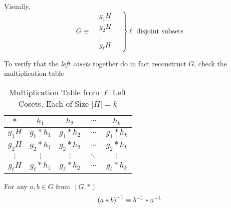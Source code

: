 \begin{remark}
    Visually,
    \begin{equation}
        G \equiv \left. \begin{matrix}
            &\boxed{{g_1} H} \\
            &\boxed{{g_2} H} \\
            &\vdots \\
            &\boxed{{g_\ell} H}
        \end{matrix} \quad \right\} \ell \text{ disjoint subsets}
    \end{equation}
    
    To verify that the \textit{left cosets} together do in fact reconstruct $G$, check the multiplication table
    \begin{table}[H]
    \centering
    \begin{tabular}{c | c c c c}
    \toprule
    $\ast$     & $h_1$             & $h_2$             & $\cdots$ & $h_k$ \\ 
    \midrule
    $g_1 H$    & $g_1 \ast h_1$    & $g_1 \ast h_2$    & $\cdots$ & $g_1 \ast h_k$ \\
    $g_2 H$    & $g_2 \ast h_1$    & $g_2 \ast h_2$    & $\cdots$ & $g_2 \ast h_k$ \\
    $\vdots$   & $\vdots$          & $\vdots$          & $\ddots$ & $\vdots$ \\
    $g_\ell H$ & $g_\ell \ast h_1$ & $g_\ell \ast h_2$ & $\cdots$ & $g_\ell \ast h_k$ \\ 
    \bottomrule
    \end{tabular}
    \caption{Multiplication Table from $\ell$ Left Cosets, Each of Size $\lvert H \rvert = k$}
    \end{table}
\end{remark}

\begin{proposition}\label{prop:inverse-element-identity}
    For any $a, b \in G$ from $(G, \ast)$
    \begin{equation}
        {(a \ast b)}^{-1} \equiv {b}^{-1} \ast {a}^{-1}
    \end{equation}
\end{proposition}

